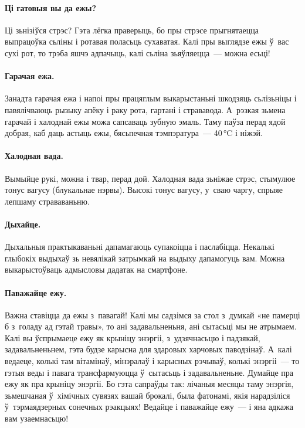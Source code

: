 \paragraph{Ці гатовыя вы да ежы?}
Ці зьнізіўся стрэс? Гэта лёгка праверыць, бо пры стрэсе прыгнятаецца выпрацоўка сьліны і ротавая поласьць сухаватая. Калі пры выглядзе ежы ў~вас сухі рот, то трэба яшчэ адпачыць, калі сьліна зьяўляецца~--- можна есьці!

\paragraph{Гарачая ежа.}
Занадта гарачая ежа і напоі пры працяглым выкарыстаньні шкодзяць сьлізьніцы і павялічваюць рызыку апёку і раку рота, гартані і стрававода. А~рэзкая зьмена гарачай і халоднай ежы можа сапсаваць зубную эмаль. Таму паўза перад ядой добрая, каб даць астыць ежы, бясьпечная тэмпэратура~--- 40\,°C і ніжэй.

\paragraph{Халодная вада.}
Вымыйце рукі, можна і твар, перад дой. Халодная вада зьніжае стрэс, стымулюе тонус вагусу (блукальнае нэрвы). Высокі тонус вагусу, у~сваю чаргу, спрыяе лепшаму страваваньню.

\paragraph{Дыхайце.}
Дыхальныя практыкаваньні дапамагаюць супакоіцца і паслабіцца. Некалькі глыбокіх выдыхаў зь невялікай затрымкай на выдыху дапамогуць вам. Можна выкарыстоўваць адмысловы дадатак на смартфоне.

\paragraph{Паважайце ежу.}
Важна ставіцца да ежы з~павагай! Калі мы садзімся за стол з~думкай «не памерці б з~голаду ад гэтай травы», то ані задавальненьня, ані сытасьці мы не атрымаем. Калі вы ўспрымаеце ежу як крыніцу энэргіі, з~удзячнасьцю і падзякай, задавальненьнем, гэта будзе карысна для здаровых харчовых паводзінаў. А~калі ведаеце, колькі там вітамінаў, мінэралаў і карысных рэчываў, колькі энэргіі~--- то гэтыя веды і павага трансфармуюцца ў~сытасьць і задавальненьне. Думайце пра ежу як пра крыніцу энэргіі. Бо гэта сапраўды так: лічаныя месяцы таму энэргія, зьмешчаная ў~хімічных сувязях вашай брокалі, была фатонамі, якія нарадзіліся ў~тэрмаядзерных сонечных рэакцыях! Ведайце і паважайце ежу~--- і яна адкажа вам узаемнасьцю!


